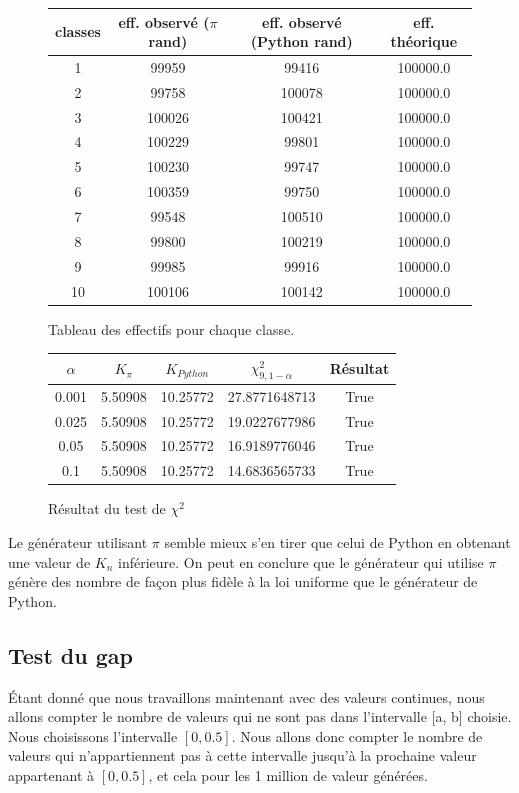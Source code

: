 \documentclass[10pt,a4paper]{article}
\begin{document}
\begin{figure}[H]
\begin{center}
\begin{longtable}{|c|c|c|c|}
\hline
classes & eff. observé ($\pi$ rand) & eff. observé (Python rand) & eff. théorique\\
\hline
1 & 99959 & 99416 & 100000.0\\
2 & 99758 & 100078 & 100000.0\\
3 & 100026 & 100421 & 100000.0\\
4 & 100229 & 99801 & 100000.0\\
5 & 100230 & 99747 & 100000.0\\
6 & 100359 & 99750 & 100000.0\\
7 & 99548 & 100510 & 100000.0\\
8 & 99800 & 100219 & 100000.0\\
9 & 99985 & 99916 & 100000.0\\
10 & 100106 & 100142 & 100000.0\\
\hline
\end{longtable}
\end{center}
\caption{Tableau des effectifs pour chaque classe.}
\end{figure}
\begin{figure}[H]
\begin{center}
\begin{tabular}{|c|c|c|c|c|}
\hline
$\alpha$ & $K_{\pi}$ & $K_{Python}$ & $\chi^2_{9, 1 - \alpha}$ & Résultat\\
\hline
0.001 & 5.50908 & 10.25772 & 27.8771648713 & True\\
0.025 & 5.50908 & 10.25772 & 19.0227677986 & True\\
0.05 & 5.50908 & 10.25772 & 16.9189776046 & True\\
0.1 & 5.50908 & 10.25772 & 14.6836565733 & True\\
\hline
\end{tabular}
\end{center}
\caption{Résultat du test de $\chi^2$}
\end{figure}
Le générateur utilisant $\pi$ semble mieux s'en tirer que celui de Python en obtenant une valeur de $K_n$ inférieure. On peut en conclure que le générateur qui utilise $\pi$ génère des nombre de façon plus fidèle à la loi uniforme que le générateur de Python.
\subsection{Test du gap}
\'Etant donné que nous travaillons maintenant avec des valeurs continues, nous allons compter le nombre de valeurs qui ne sont pas dans l'intervalle [a, b] choisie. Nous choisissons l'intervalle $[0, 0.5]$. Nous allons donc compter le nombre de valeurs qui n'appartiennent pas à cette intervalle jusqu'à la prochaine valeur appartenant à $[0, 0.5]$, et cela pour les 1 million de valeur générées.\\
\end{document}
